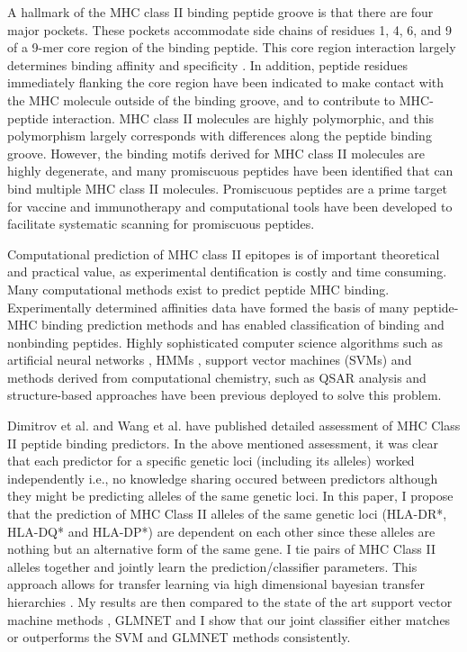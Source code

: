 \documentclass[conference,10pt,draftclsnofoot,onecolumn]{IEEEtran}
\begin{document}
A hallmark of the MHC class II binding peptide groove is that there are four major pockets. These pockets accommodate side chains of
residues 1, 4, 6, and 9 of a 9-mer core region of the binding peptide. This core region interaction largely determines binding affinity
and specificity \cite{jones06}. In addition, peptide residues immediately flanking the core region have been indicated to make contact with the
MHC molecule outside of the binding groove, and to contribute to MHC-peptide interaction.  MHC class II molecules are highly polymorphic, and this
polymorphism largely corresponds with differences along the peptide binding groove. However, the binding motifs derived for
MHC class II molecules are highly degenerate, and many promiscuous peptides have been identified that can bind multiple
MHC class II molecules. Promiscuous peptides are a prime target for vaccine and immunotherapy and computational tools
have been developed to facilitate systematic scanning for promiscuous peptides.

Computational prediction of MHC class II epitopes is of important theoretical and practical value, as experimental dentification
is costly and time consuming. Many computational methods exist to predict peptide MHC binding. Experimentally determined affinities
data have formed the basis of many peptide-MHC binding prediction methods and has enabled classification of binding and
nonbinding peptides. Highly sophisticated computer science algorithms such as artificial neural networks \cite{gulukota00},
HMMs \cite{noguchi02}, support vector machines (SVMs) \cite{wan06} and methods derived from computational chemistry,
such as QSAR analysis \cite{doytchinova05} and structure-based approaches \cite{davies06} have been previous deployed to solve this problem.

Dimitrov et al. \cite{dimitrov10} and Wang et al. \cite{wang08} have published detailed assessment of MHC Class II peptide binding
predictors. In the above mentioned assessment, it was clear that each predictor for a specific genetic loci (including its alleles)
worked independently i.e., no knowledge sharing occured between predictors although they might be predicting alleles of the same genetic loci.
In this paper, I propose that the prediction of MHC Class II alleles of the same genetic loci (HLA-DR*, HLA-DQ* and HLA-DP*) are dependent
on each other since these alleles are nothing but an alternative form of the same gene. I tie pairs of MHC Class II alleles together and jointly
learn the prediction/classifier parameters. This approach allows for transfer learning via high dimensional bayesian transfer hierarchies \cite{elidan08}.
My results are then compared to the state of the art support vector machine methods \cite{wan06}, GLMNET \cite{friedman09}
and I show that our joint classifier either matches or outperforms the SVM and GLMNET methods consistently.
\end{document}
